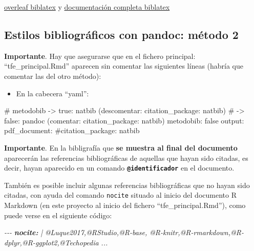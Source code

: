 \documentclass[12pt,a4paper,oneside,]{book}
\newenvironment{Shaded}{\begin{snugshade}}{\end{snugshade}}
\newcommand{\AnnotationTok}[1]{\textcolor[rgb]{0.56,0.35,0.01}{\textbf{\textit{#1}}}}
\newcommand{\CommentTok}[1]{\textcolor[rgb]{0.56,0.35,0.01}{\textit{#1}}}
\newcommand{\FunctionTok}[1]{\textcolor[rgb]{0.00,0.00,0.00}{#1}}
\newcommand{\NormalTok}[1]{#1}
\providecommand{\tightlist}{%
  \setlength{\itemsep}{0pt}\setlength{\parskip}{0pt}}
\numberwithin{dummy}{section}
\theoremstyle{ocrenumbox}
\theoremstyle{blacknumex}
\theoremstyle{blacknumbox}
\theoremstyle{ocrenum}
\theoremstyle{ocrenum}
\begin{document}
\href{https://www.overleaf.com/learn/latex/Articles/Getting_started_with_BibLaTeX}{overleaf
biblatex} y
\href{http://mirror.ox.ac.uk/sites/ctan.org/macros/latex/contrib/biblatex/doc/biblatex.pdf}{documentación
completa biblatex}

\hypertarget{bibliografiametodo2}{%
\subsection{Estilos bibliográficos con pandoc: método
2}\label{bibliografiametodo2}}

\textbf{Importante}. Hay que asegurarse que en el fichero principal:
``tfe\_principal.Rmd'' aparecen sin comentar las siguientes líneas
(habría que comentar las del otro método):

\begin{itemize}
\tightlist
\item
  En la cabecera ``yaml'':
\end{itemize}

\footnotesize

\begin{Shaded}
\begin{Highlighting}[]
\FunctionTok{\# metodobib {-}\textgreater{} true: natbib (descomentar: citation\_package: natbib) }
\FunctionTok{\#           {-}\textgreater{} false: pandoc (comentar: citation\_package: natbib)}
\NormalTok{metodobib: false}
\NormalTok{output: }
\NormalTok{  pdf\_document: }
\NormalTok{    \#citation\_package: natbib}
\end{Highlighting}
\end{Shaded}

\normalsize

\textbf{Importante}. En la bibligrafía que \textbf{se muestra al final
del documento} aparecerán las referencias bibliográficas de aquellas que
hayan sido citadas, es decir, hayan aparecido en un comando
\textbf{\texttt{@identificador}} en el documento.

También es posible incluir algunas referencias bibliográficas que no
hayan sido citadas, con ayuda del comando \texttt{nocite} situado al
inicio del documento R Markdown (en este proyecto al inicio del fichero
``tfe\_principal.Rmd''), como puede verse en el siguiente código:

\begin{Shaded}
\begin{Highlighting}[]
\CommentTok{{-}{-}{-}}
\AnnotationTok{nocite:}\CommentTok{ | }
\CommentTok{  @Luque2017,@RStudio,@R{-}base,}
\CommentTok{  @R{-}knitr,@R{-}rmarkdown,@R{-}dplyr,@R{-}ggplot2,@Techopedia}
\CommentTok{...}
\end{Highlighting}
\end{Shaded}
\end{document}
